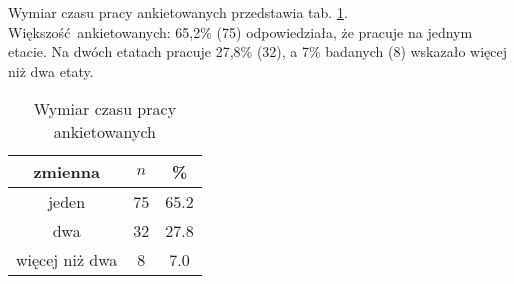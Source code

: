 
Wymiar czasu pracy ankietowanych przedstawia tab. \ref{tab:Q2}. Większość ankietowanych: 65,2\% (75) odpowiedziała, że pracuje na jednym etacie. Na dwóch etatach pracuje 27,8\% (32), a 7\%  badanych (8) wskazało więcej niż dwa etaty.
\begin{table}[H]
\caption{Wymiar czasu pracy ankietowanych}
\centering
\begin{tabular}{ | c | c | c |}
\hline
zmienna & $n$ & \% \\
\hline
jeden  &  75  & 65.2 \\
\hline
dwa  &  32  & 27.8 \\
\hline
więcej niż dwa  &  8  & 7.0 \\
\hline
\end{tabular}
\label{tab:Q2}
\end{table}

